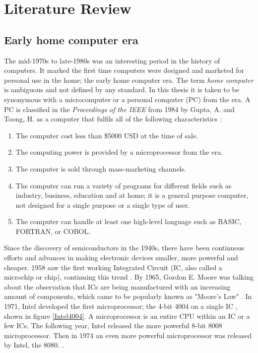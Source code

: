 
\chapter{Literature Review} %
\label{Chapter2} %

\section{Early home computer era} \label{sec: Early home computer era}
 
The mid-1970s to late-1980s was an interesting period in the history of computers. It marked the first time computers were designed and marketed for personal use in the home; the early home computer era. The term \textit{home computer} is ambiguous and not defined by any standard. In this thesis it is taken to be synonymous with a microcomputer or a personal computer (PC) from the era. A PC is classified in the \textit{Proceedings of the IEEE} from 1984 by Gupta, A. and Toong, H. as a computer that fulfils all of the following characteristics 
\cite{RN24}: 

\begin{enumerate}
\item The computer cost less than \$5000 USD at the time of sale.
\item The computing power is provided by a microprocessor from the era. 
\item The computer is sold through mass-marketing channels. 
\item The computer can run a variety of programs for different fields such as industry, business, education and at home; it is a general purpose computer, not designed for a single purpose or a single type of user.
\item The computer can handle at least one high-level language such as BASIC, FORTRAN, or COBOL.
\end{enumerate}

Since the discovery of semiconductors in the 1940s, there have been continuous efforts and advances in making electronic devices smaller, more powerful and cheaper. 1958 saw the first working Integrated Circuit (IC, also called a microchip or chip), continuing this trend 
\cite{RN36}. By 1965, Gordon E. Moore was talking about the observation that ICs are being manufactured with an increasing amount of components, which came to be popularly known as "Moore's Law" 
\cite{RN33}. In 1971, Intel developed the first microprocessor; the 4-bit 4004 on a single IC 
\cite{RN37}, shown in figure \ref{Intel4004}. A microprocessor is an entire CPU within an IC or a few ICs. The following year, Intel released the more powerful 8-bit 8008 microprocessor. Then in 1974 an even more powerful microprocessor was released by Intel, the 8080. 
\cite{RN38}. 

